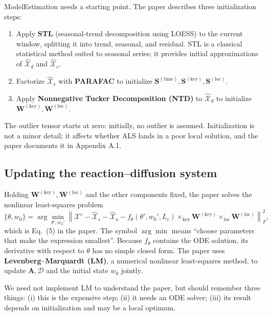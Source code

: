 ModelEstimation needs a starting point. The paper describes three initialization steps:
\begin{enumerate}
  \item Apply \textbf{STL} (seasonal-trend decomposition using LOESS) to the current window, splitting
        it into trend, seasonal, and residual. STL is a classical statistical method suited to
        seasonal series; it provides initial approximations of $\widehat{\mathcal{X}}_d$ and
        $\widehat{\mathcal{X}}_s$.
  \item Factorize $\widehat{\mathcal{X}}_s$ with \textbf{PARAFAC} to initialize
        $\mathbf{S}^{(\mathrm{time})},\mathbf{S}^{(\mathrm{key})},\mathbf{S}^{(\mathrm{loc})}$.
  \item Apply \textbf{Nonnegative Tucker Decomposition (NTD)} to $\widehat{\mathcal{X}}_d$ to
        initialize $\mathbf{W}^{(\mathrm{key})},\mathbf{W}^{(\mathrm{loc})}$.
\end{enumerate}
The outlier tensor starts at zero: initially, no outlier is assumed. Initialization is not a minor
detail; it affects whether ALS lands in a poor local solution, and the paper documents it in
Appendix A.1.

\subsection{Updating the reaction--diffusion system}

Holding $\mathbf{W}^{(\mathrm{key})},\mathbf{W}^{(\mathrm{loc})}$ and the other components fixed, the
paper solves the nonlinear least-squares problem
\begin{equation}
  \{\theta,w_0\}
  =\arg\min_{\theta',w_0'}
   \left\|
     \mathcal{X}^{c}-\widehat{\mathcal{X}}_s-\widehat{\mathcal{X}}_o
     -f_\theta(\theta',w_0',L_c)
       \times_{\mathrm{key}}\mathbf{W}^{(\mathrm{key})}
       \times_{\mathrm{loc}}\mathbf{W}^{(\mathrm{loc})}
   \right\|_F^2,
  \label{eq:lm-estimation}
\end{equation}
which is Eq.~(5) in the paper. The symbol $\arg\min$ means ``choose parameters that make the expression
smallest''. Because $f_\theta$ contains the ODE solution, its derivative with respect to $\theta$ has no
simple closed form. The paper uses \textbf{Levenberg--Marquardt (LM)}, a numerical nonlinear
least-squares method, to update $\mathbf{A},\mathcal{D}$ and the initial state $w_0$ jointly.

We need not implement LM to understand the paper, but should remember three things: (i) this is the
expensive step; (ii) it needs an ODE solver; (iii) its result depends on initialization and may be a
local optimum.


